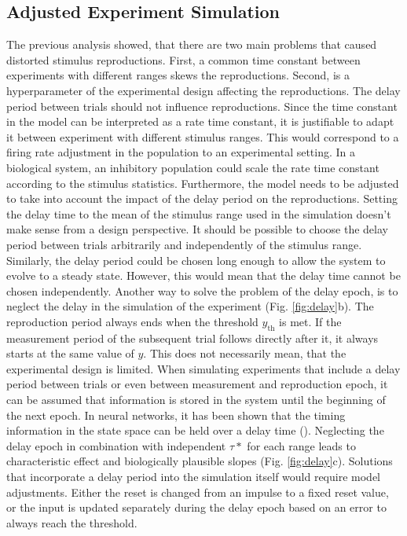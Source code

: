 \documentclass[10pt]{article}
\begin{document}
\subsection{Adjusted Experiment Simulation}
The previous analysis showed, that there are two main problems that caused distorted stimulus reproductions. 
First, a common time constant between experiments with different ranges skews the reproductions.
Second, is a hyperparameter of the experimental design affecting the reproductions. The delay period between trials should not influence reproductions.
Since the time constant in the model can be interpreted as a rate time constant, it is justifiable to adapt it between experiment with different stimulus ranges. 
This would correspond to a firing rate adjustment in the population to an experimental setting.
In a biological system, an inhibitory population could scale the rate time constant according to the stimulus statistics.
Furthermore, the model needs to be adjusted to take into account the impact of the delay period on the reproductions. 
Setting the delay time to the mean of the stimulus range used in the simulation doesn't make sense from a design perspective. It should be possible to choose the delay period between trials arbitrarily and independently of the stimulus range. 
Similarly, the delay period could be chosen long enough to allow the system to evolve to a steady state. However, this would mean that the delay time cannot be chosen independently.
Another way to solve the problem of the delay epoch, is to neglect the delay in the simulation of the experiment (Fig. \ref{fig:delay}b).
The reproduction period always ends when the threshold $y_\text{th}$ is met. If the measurement period of the subsequent trial follows directly after it, it always starts at the same value of $y$. 
This does not necessarily mean, that the experimental design is limited. When simulating experiments that include a delay period between trials or even between measurement and reproduction epoch, it can be assumed that information is stored in the system until the beginning of the next epoch. 
In neural networks, it has been shown that the timing information in the state space can be held over a delay time (\cite{Bi2020}).
Neglecting the delay epoch in combination with independent $\tau*$ for each range leads to characteristic effect and biologically plausible slopes (Fig. \ref{fig:delay}c).
Solutions that incorporate a delay period into the simulation itself would require model adjustments.
Either the reset is changed from an impulse to a fixed reset value, or the input is updated separately during the delay epoch based on an error to always reach the threshold. 
\end{document}
